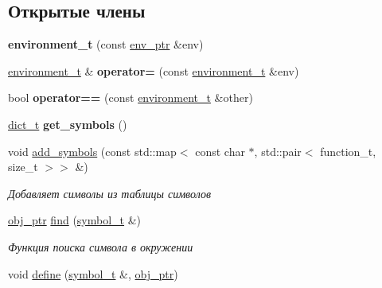 \subsection*{Открытые члены}
\begin{DoxyCompactItemize}
\item 
\mbox{\label{classenvironment__t_ae631097efee20f081155ff042846e78a}} 
{\bfseries environment\+\_\+t} (const \mbox{\hyperlink{classmm__ptr}{env\+\_\+ptr}} \&env)
\item 
\mbox{\label{classenvironment__t_a5fd6c05d0a06a1a8e11e55488a171c92}} 
\mbox{\hyperlink{classenvironment__t}{environment\+\_\+t}} \& {\bfseries operator=} (const \mbox{\hyperlink{classenvironment__t}{environment\+\_\+t}} \&env)
\item 
\mbox{\label{classenvironment__t_a7c7e79b474187b68cb00105b1ab40483}} 
bool {\bfseries operator==} (const \mbox{\hyperlink{classenvironment__t}{environment\+\_\+t}} \&other)
\item 
\mbox{\label{classenvironment__t_a09bf874d308fe51efbcc1632cc8e7b4e}} 
\mbox{\hyperlink{dict__t_8hpp_a56fdc8959ea1ff56de0242f602b1e649}{dict\+\_\+t}} {\bfseries get\+\_\+symbols} ()
\item 
void \mbox{\hyperlink{classenvironment__t_ac45c20ebf992a8288b2f3fc80cc4ec7e}{add\+\_\+symbols}} (const std\+::map$<$ const char $\ast$, std\+::pair$<$ function\+\_\+t, size\+\_\+t $>$$>$ \&)
\begin{DoxyCompactList}\small\item\em Добавляет символы из таблицы символов \end{DoxyCompactList}\item 
\mbox{\hyperlink{classmm__ptr}{obj\+\_\+ptr}} \mbox{\hyperlink{classenvironment__t_a29d163ecd74f5fae6a0ac5614d580387}{find}} (\mbox{\hyperlink{lisp__types_8hpp_a543c62d3ca4ba3750602b9c6b11af1de}{symbol\+\_\+t}} \&)
\begin{DoxyCompactList}\small\item\em Функция поиска символа в окружении \end{DoxyCompactList}\item 
void \mbox{\hyperlink{classenvironment__t_a5186921234c3252294cbd37e6616dc26}{define}} (\mbox{\hyperlink{lisp__types_8hpp_a543c62d3ca4ba3750602b9c6b11af1de}{symbol\+\_\+t}} \&, \mbox{\hyperlink{classmm__ptr}{obj\+\_\+ptr}})
$$
\end{DoxyCompactItemize}
